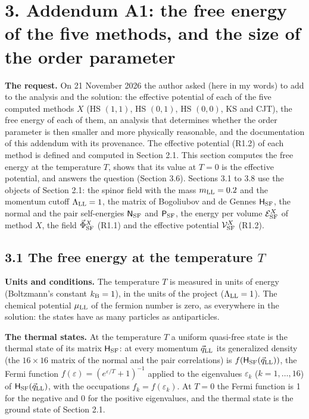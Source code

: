\documentclass[
  10pt,
]{article}
\begin{document}
\hypertarget{addendum-a1-the-free-energy-of-the-five-methods-and-the-size-of-the-order-parameter}{%
\section{3. Addendum A1: the free energy of the five methods, and the
size of the order
parameter}\label{addendum-a1-the-free-energy-of-the-five-methods-and-the-size-of-the-order-parameter}}

\textbf{The request.} On 21 November 2026 the author asked (here in my
words) to add to the analysis and the solution: the effective potential
of each of the five computed methods \(X\) (HS \((1,1)\), HS \((0,1)\),
HS \((0,0)\), KS and CJT), the free energy of each of them, an analysis
that determines whether the order parameter is then smaller and more
physically reasonable, and the documentation of this addendum with its
provenance. The effective potential (R1.2) of each method is defined and
computed in Section 2.1. This section computes the free energy at the
temperature \(T\), shows that its value at \(T=0\) is the effective
potential, and answers the question (Section 3.6). Sections 3.1 to 3.8
use the objects of Section 2.1: the spinor field with the mass
\(m_{\rm LL}=0.2\) and the momentum cutoff \(\Lambda_{\rm LL}=1\), the
matrix of Bogoliubov and de Gennes \(\mathsf H_{\rm SF}\), the normal
and the pair self-energies \(\mathsf N_{\rm SF}\) and
\(\mathsf P_{\rm SF}\), the energy per volume \(\mathcal E^X_{\rm SF}\)
of method \(X\), the field \(\vec\Phi^X_{\rm SF}\) (R1.1) and the
effective potential \(\mathcal V^X_{\rm SF}\) (R1.2).

\hypertarget{the-free-energy-at-the-temperature-t}{%
\subsection{\texorpdfstring{3.1 The free energy at the temperature
\(T\)}{3.1 The free energy at the temperature T}}\label{the-free-energy-at-the-temperature-t}}

\textbf{Units and conditions.} The temperature \(T\) is measured in
units of energy (Boltzmann's constant \(k_{\rm B}=1\)), in the units of
the project (\(\Lambda_{\rm LL}=1\)). The chemical potential
\(\mu_{\rm LL}\) of the fermion number is zero, as everywhere in the
solution: the states have as many particles as antiparticles.

\textbf{The thermal states.} At the temperature \(T\) a uniform
quasi-free state is the thermal state of its matrix
\(\mathsf H_{\rm SF}\): at every momentum \(\vec q_{\rm LL}\) its
generalized density (the \(16\times16\) matrix of the normal and the
pair correlations) is \(f(\mathsf H_{\rm SF}(\vec q_{\rm LL}))\), the
Fermi function \(f(\varepsilon)=(e^{\varepsilon/T}+1)^{-1}\) applied to
the eigenvalues \(\varepsilon_k\) (\(k=1,\dots,16\)) of
\(\mathsf H_{\rm SF}(\vec q_{\rm LL})\), with the occupations
\(f_k=f(\varepsilon_k)\). At \(T=0\) the Fermi function is 1 for the
negative and 0 for the positive eigenvalues, and the thermal state is
the ground state of Section 2.1.
\end{document}
